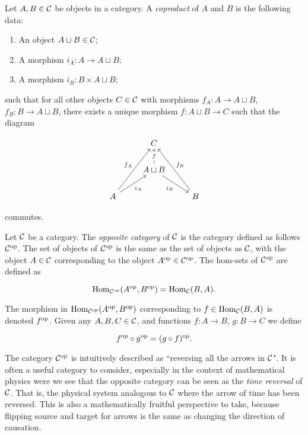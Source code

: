 \begin{defn}[Coproduct]\label{coproduct-definition} Let $A,B\in {\mathcal C}$ be objects in a category. A {\em coproduct} of $A$ and $B$ is the following data:

\begin{enumerate}
\item An object $A\sqcup B\in {\mathcal C}$;
\item A morphism $i_A:A\to A\sqcup B$;
\item A morphism $i_B:B\times A\sqcup B$;
\end{enumerate}

such that for all other objects $C\in {\mathcal C}$ with morphisms $f_A:A\to A\sqcup B$, $f_B:B\to A\sqcup B$, there exists a unique morphism $f:A\sqcup B\to C$ such that the diagram

\[\begin{tikzcd}
	& C \\
	& {A\sqcup B} \\
	A && B
	\arrow["f"{description}, from=2-2, to=1-2]
	\arrow["{i_B}"', from=2-2, to=3-3]
	\arrow["{f_A}", from=3-1, to=1-2]
	\arrow["{i_A}"', from=3-1, to=2-2]
	\arrow["{f_B}"', from=3-3, to=1-2]
\end{tikzcd}\]

commutes.


\end{defn}

\begin{defn} Let ${\mathcal C}$ be a category. The {\em opposite category} of ${\mathcal C}$ is the category defined as follows ${\mathcal C}^{\operatorname{op}}$. The set of objects of ${\mathcal C}^{\operatorname{op}}$ is the same as the set of objects as ${\mathcal C}$, with the object $A\in {\mathcal C}$ corresponding to the object $A^{\operatorname{op}}\in {\mathcal C}^{\operatorname{op}}$. The hom-sets of ${\mathcal C}^{\operatorname{op}}$ are defined as

$$\operatorname{Hom}_{{\mathcal C}^{\operatorname{op}}}(A^{\operatorname{op}},B^{\operatorname{op}})=\operatorname{Hom}_{{\mathcal C}}(B,A).$$

The morphism in $\operatorname{Hom}_{{\mathcal C}^{\operatorname{op}}}(A^{\operatorname{op}},B^{\operatorname{op}})$ corresponding to $f\in \operatorname{Hom}_{{\mathcal C}}(B,A)$ is denoted $f^{\operatorname{op}}$. Given any $A,B,C\in {\mathcal C}$, and functions $f:A\to B$, $g:B\to C$ we define

$$f^{\operatorname{op}}\circ g^{\operatorname{op}}=(g\circ f)^{\operatorname{op}}.$$
\end{defn}

\begin{rem} The category ${\mathcal C}^{\operatorname{op}}$ is intuitively described as ``reversing all the arrows in ${\mathcal C}$". It is often a useful category to consider, especially in the context of mathematical physics were we see that the opposite category can be seen as the {\em time reversal} of ${\mathcal C}$. That is, the physical system analogous to ${\mathcal C}$ where the arrow of time has been reversed. This is also a mathematically fruitful perspective to take, because flipping source and target for arrows is the same as changing the direction of causation.
\end{rem}

